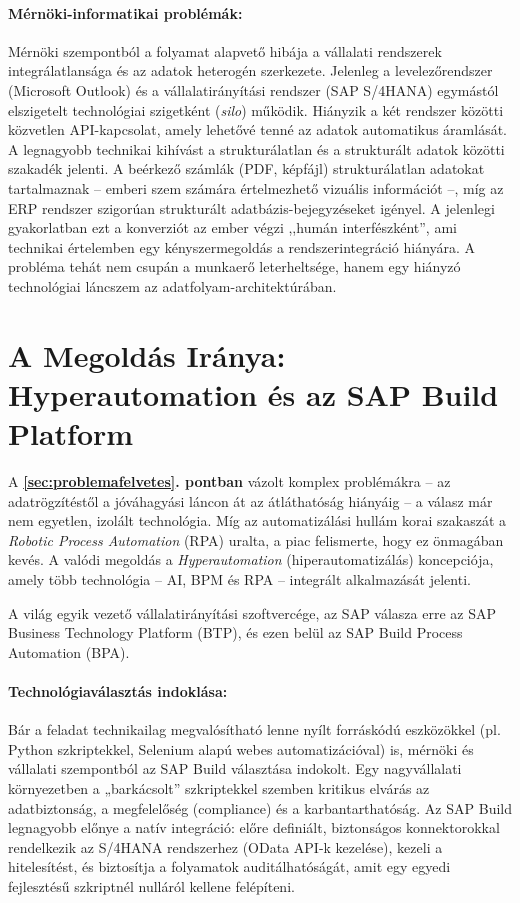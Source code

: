 \paragraph{Mérnöki-informatikai problémák:} Mérnöki szempontból a folyamat alapvető hibája a vállalati rendszerek integrálatlansága és az adatok heterogén szerkezete.
Jelenleg a levelezőrendszer (Microsoft Outlook) és a vállalatirányítási rendszer (SAP S/4HANA) egymástól elszigetelt technológiai szigetként (\textit{silo}) működik. Hiányzik a két rendszer közötti közvetlen API-kapcsolat, amely lehetővé tenné az adatok automatikus áramlását.
A legnagyobb technikai kihívást a strukturálatlan és a strukturált adatok közötti szakadék jelenti. A beérkező számlák (PDF, képfájl) strukturálatlan adatokat tartalmaznak – emberi szem számára értelmezhető vizuális információt –, míg az ERP rendszer szigorúan strukturált adatbázis-bejegyzéseket igényel.
A jelenlegi gyakorlatban ezt a konverziót az ember végzi ,,humán interfészként'', ami technikai értelemben egy kényszermegoldás a rendszerintegráció hiányára. A probléma tehát nem csupán a munkaerő leterheltsége, hanem egy hiányzó technológiai láncszem az adatfolyam-architektúrában.

\section{A Megoldás Iránya: Hyperautomation és az SAP Build Platform}
\label{sec:megoldas_iranya}

A \textbf{\ref{sec:problemafelvetes}. pontban} vázolt komplex problémákra -- az adatrögzítéstől a jóváhagyási láncon át az átláthatóság hiányáig -- a válasz már nem egyetlen, izolált technológia.
Míg az automatizálási hullám korai szakaszát a \textit{Robotic Process Automation} (RPA) uralta, a piac felismerte, hogy ez önmagában kevés. A valódi megoldás a \textit{Hyperautomation} (hiperautomatizálás) koncepciója, amely több technológia -- AI, BPM és RPA -- integrált alkalmazását jelenti.

A világ egyik vezető vállalatirányítási szoftvercége, az SAP válasza erre az SAP Business Technology Platform (BTP), és ezen belül az SAP Build Process Automation (BPA).
\paragraph{Technológiaválasztás indoklása:} Bár a feladat technikailag megvalósítható lenne nyílt forráskódú eszközökkel (pl. Python szkriptekkel, Selenium alapú webes automatizációval) is, mérnöki és vállalati szempontból az SAP Build választása indokolt.
Egy nagyvállalati környezetben a „barkácsolt” szkriptekkel szemben kritikus elvárás az adatbiztonság, a megfelelőség (compliance) és a karbantarthatóság. Az SAP Build legnagyobb előnye a natív integráció: előre definiált, biztonságos konnektorokkal rendelkezik az S/4HANA rendszerhez (OData API-k kezelése), kezeli a hitelesítést, és biztosítja a folyamatok auditálhatóságát, amit egy egyedi fejlesztésű szkriptnél nulláról kellene felépíteni.

